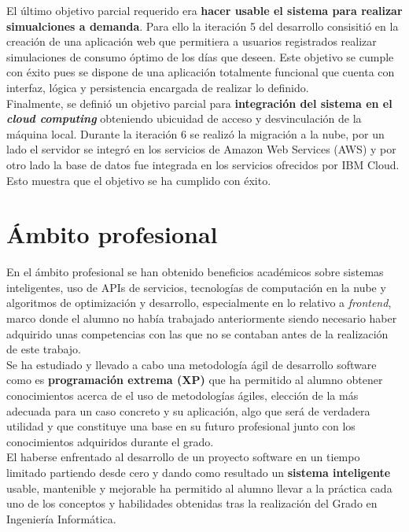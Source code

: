 El último objetivo parcial requerido era \textbf{hacer usable el sistema para realizar simualciones a demanda}. Para ello la iteración 5 del desarrollo consisitió en la creación de una aplicación web que permitiera a usuarios registrados realizar simulaciones de consumo óptimo de los días que deseen. Este objetivo se cumple con éxito pues se dispone de una aplicación totalmente funcional que cuenta con interfaz, lógica y persistencia encargada de realizar lo definido.\\

Finalmente, se definió un objetivo parcial para \textbf{integración del sistema en el \textit{cloud computing}} obteniendo ubicuidad de acceso y desvinculación de la máquina local. Durante la iteración 6 se realizó la migración a la nube, por un lado el servidor se integró en los servicios de Amazon Web Services (AWS) y por otro lado la base de datos fue integrada en los servicios ofrecidos por IBM Cloud. Esto muestra que el objetivo se ha cumplido con éxito.\\
\section{Ámbito profesional}
En el ámbito profesional se han obtenido beneficios académicos sobre sistemas inteligentes, uso de APIs de servicios, tecnologías de computación en la nube y algoritmos de optimización y desarrollo, especialmente en lo relativo a \textit{frontend}, marco donde el alumno no había trabajado anteriormente siendo necesario haber adquirido unas competencias con las que no se contaban antes de la realización de este trabajo.\\
Se ha estudiado y llevado a cabo una metodología ágil de desarrollo software como es \textbf{programación extrema (XP)} que ha permitido al alumno obtener conocimientos acerca de el uso de metodologías ágiles, elección de la más adecuada para un caso concreto y su aplicación, algo que será de verdadera utilidad y que constituye una base en su futuro profesional junto con los conocimientos adquiridos durante el grado.\\

El haberse enfrentado al desarrollo de un proyecto software en un tiempo limitado partiendo desde cero y dando como resultado un \textbf{sistema inteligente} usable, mantenible y mejorable ha permitido al alumno llevar a la práctica cada uno de los conceptos y habilidades obtenidas tras la realización del Grado en Ingeniería Informática.
